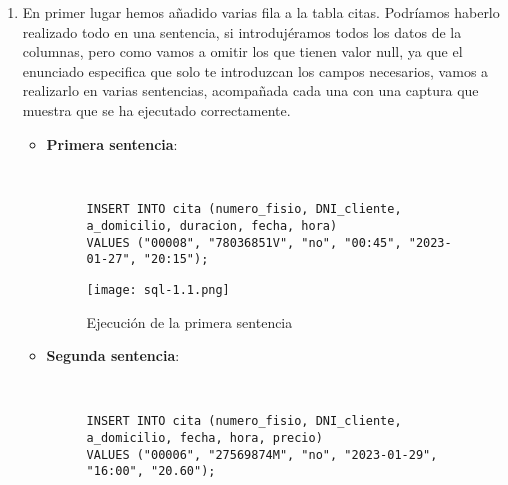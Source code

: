 \begin{enumerate}
    \item En primer lugar hemos añadido varias fila a la tabla citas. Podríamos haberlo realizado todo en una sentencia, si introdujéramos todos los datos de la columnas, pero como vamos a omitir los que tienen valor null, ya que el enunciado especifica que solo te introduzcan los campos necesarios, vamos a realizarlo en varias sentencias, acompañada cada una con una captura que muestra que se ha ejecutado correctamente.

    \begin{itemize}
        \item \textbf{Primera sentencia}:

        \begin{figure}[H]
            \begin{tcolorbox}[sharp corners, colback=yellow!30, colframe=white!20]
                \scriptsize
                \begin{verbatim}


INSERT INTO cita (numero_fisio, DNI_cliente, a_domicilio, duracion, fecha, hora)
VALUES ("00008", "78036851V", "no", "00:45", "2023-01-27", "20:15");
                \end{verbatim}
            \end{tcolorbox}
        \end{figure}

        \begin{figure}[H]
            \centering
            \texttt{[image: sql-1.1.png]}
            \caption{Ejecución de la primera sentencia}
        \end{figure}

        \item \textbf{Segunda sentencia}:

        \begin{figure}[H]
            \begin{tcolorbox}[sharp corners, colback=yellow!30, colframe=white!20]
                \scriptsize
                \begin{verbatim}


INSERT INTO cita (numero_fisio, DNI_cliente, a_domicilio, fecha, hora, precio)
VALUES ("00006", "27569874M", "no", "2023-01-29", "16:00", "20.60");
                \end{verbatim}
            \end{tcolorbox}
        \end{figure}


\end{itemize}
\end{enumerate}
